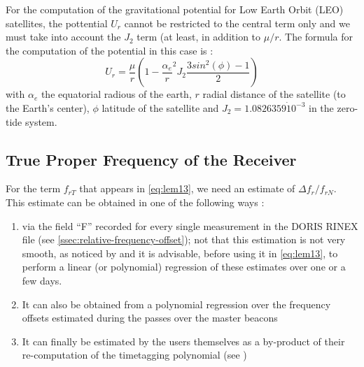 For the computation of the gravitational potential for Low Earth Orbit (LEO) satellites, 
the pottential \(U_r\) cannot be restricted to the central term only and we must 
take into account the \(J_2\) term (at least, in addition to \(\mu / r\). The formula 
for the computation of the potential in this case is \cite{lemoine-2016}:
\begin{equation}
    U_r = \frac{\mu}{r} (1-{\frac{\alpha_e}{r}}^2 J_2 \frac{3 sin^2(\phi) - 1}{2})
\end{equation}
with \(\alpha_e\) the equatorial radious of the earth, \(r\) radial distance of the 
satellite (to the Earth's center), \(\phi\) latitude of the satellite and \(J_2 = 1.0826359 \dot 10^{-3}\) 
in the zero-tide system.

\subsection{True Proper Frequency of the Receiver}
\label{ssec:true-proprtfrequency-of-the-receiver}

For the term \(f_{rT}\) that appears in \ref{eq:lem13}, we need an estimate of \(\Delta f_{r} / f_{rN}\). 
This estimate can be obtained in one of the following ways \cite{lemoine-2016}:
\begin{enumerate}
    \item via the field ``F'' recorded for every single measurement in the DORIS 
    RINEX file (see \ref{ssec:relative-frequency-offset}); not that this estimation 
    is not very smooth, as noticed by \cite{GAO2015} and it is advisable, before 
    using it in \ref{eq:lem13}, to perform a linear (or polynomial) regression of 
    these estimates over one or a few days.

    \item It can also be obtained from a polynomial regression
    over the frequency oﬀsets estimated during the passes
    over the master beacons

    \item It can ﬁnally be estimated by the users themselves as a
    by-product of their re-computation of the timetagging polynomial (see \cite{MERCIER2010})
\end{enumerate}